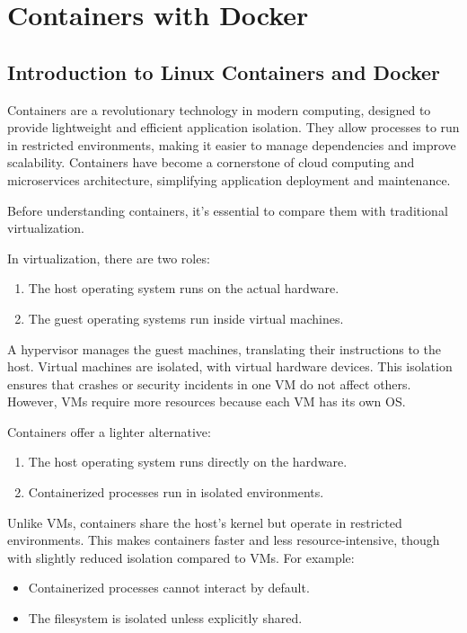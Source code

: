 \chapter{Containers with Docker}
\section{Introduction to Linux Containers and Docker}
Containers are a revolutionary technology in modern computing, designed to provide lightweight and efficient application isolation. They allow processes to run in restricted environments, making it easier to manage dependencies and improve scalability. Containers have become a cornerstone of cloud computing and microservices architecture, simplifying application deployment and maintenance.

Before understanding containers, it’s essential to compare them with traditional virtualization.

In virtualization, there are two roles:
\begin{enumerate}
    \item The host operating system runs on the actual hardware.
    \item The guest operating systems run inside virtual machines.
\end{enumerate}
A hypervisor manages the guest machines, translating their instructions to the host. Virtual machines are isolated, with virtual hardware devices. This isolation ensures that crashes or security incidents in one VM do not affect others. However, VMs require more resources because each VM has its own OS.

Containers offer a lighter alternative:
\begin{enumerate}
    \item The host operating system runs directly on the hardware.
    \item Containerized processes run in isolated environments.
\end{enumerate}
Unlike VMs, containers share the host's kernel but operate in restricted environments. This makes containers faster and less resource-intensive, though with slightly reduced isolation compared to VMs. For example:
\begin{itemize}
    \item Containerized processes cannot interact by default.
    \item The filesystem is isolated unless explicitly shared.
\end{itemize}


